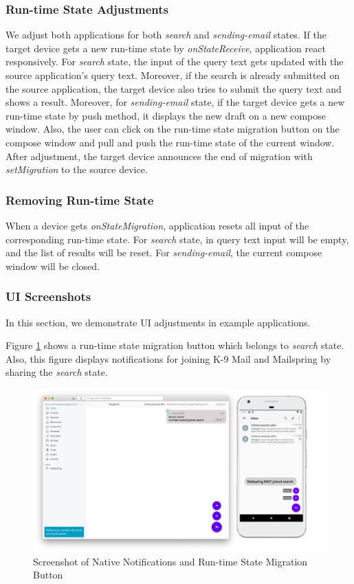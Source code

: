 \subsubsection{Run-time State Adjustments}
We adjust both applications for both \textit{search} and \textit{sending-email} states. If the target device gets a new run-time state by \textit{onStateReceive}, application react responsively. For \textit{search} state, the input of the query text gets updated with the source application's query text. Moreover, if the search is already submitted on the source application, the target device also tries to submit the query text and shows a result. Moreover, for \textit{sending-email} state, if the target device gets a new run-time state by push method, it displays the new draft on a new compose window. Also, the user can click on the run-time state migration button on the compose window and pull and push the run-time state of the current window. After adjustment, the target device announces the end of migration with \textit{setMigration} to the source device.

\subsubsection{Removing Run-time State}
When a device gets \textit{onStateMigration}, application resets all input of the corresponding run-time state. For \textit{search} state, in query text input will be empty, and the list of results will be reset. For \textit{sending-email}, the current compose window will be closed.

\subsubsection{UI Screenshots}
In this section, we demonstrate UI adjustments in example applications.

Figure \ref{fig:adapt-noti} shows a run-time state migration button which belongs to \textit{search} state. Also, this figure displays notifications for joining K-9 Mail and Mailspring by sharing the \textit{search} state.


\FloatBarrier
\begin{figure}[H]
    \includegraphics[width=\linewidth]{../figures/adapt-noti.png}
    \centering
    \caption{Screenshot of Native Notifications and Run-time State Migration Button}
    \label{fig:adapt-noti}
\end{figure}
\FloatBarrier

